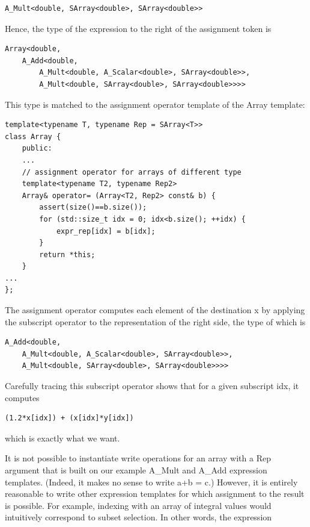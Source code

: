 \begin{lstlisting}[style=styleCXX]
A_Mult<double, SArray<double>, SArray<double>>
\end{lstlisting}

Hence, the type of the expression to the right of the assignment token is

\begin{lstlisting}[style=styleCXX]
Array<double,
	A_Add<double,
		A_Mult<double, A_Scalar<double>, SArray<double>>,
		A_Mult<double, SArray<double>, SArray<double>>>>
\end{lstlisting}

This type is matched to the assignment operator template of the Array template:

\begin{lstlisting}[style=styleCXX]
template<typename T, typename Rep = SArray<T>>
class Array {
	public:
	...
	// assignment operator for arrays of different type
	template<typename T2, typename Rep2>
	Array& operator= (Array<T2, Rep2> const& b) {
		assert(size()==b.size());
		for (std::size_t idx = 0; idx<b.size(); ++idx) {
			expr_rep[idx] = b[idx];
		}
		return *this;
	}
...
};
\end{lstlisting}

The assignment operator computes each element of the destination x by applying the subscript operator to the representation of the right side, the type of which is

\begin{lstlisting}[style=styleCXX]
A_Add<double,
	A_Mult<double, A_Scalar<double>, SArray<double>>,
	A_Mult<double, SArray<double>, SArray<double>>>>
\end{lstlisting}

Carefully tracing this subscript operator shows that for a given subscript idx, it computes

\begin{lstlisting}[style=styleCXX]
(1.2*x[idx]) + (x[idx]*y[idx])
\end{lstlisting}

which is exactly what we want.


It is not possible to instantiate write operations for an array with a Rep argument that is built on our example A\_Mult and A\_Add expression templates. (Indeed, it makes no sense to write a+b = c.) However, it is entirely reasonable to write other expression templates for which assignment to the result is possible. For example, indexing with an array of integral values would intuitively correspond to subset selection. In other words, the expression

